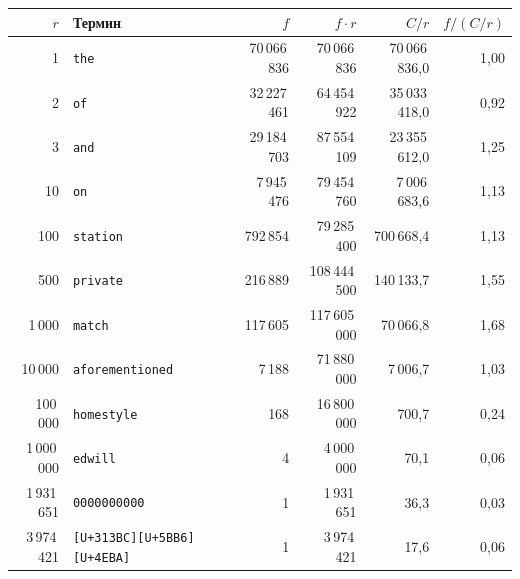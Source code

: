 \begin{tabular}{|r|l|r|r|r|r|}
\hline
$r$ & Термин & $f$ & $f \cdot r$ & $C/r$ & $f / (C/r)$ \\
\hline
1 & \texttt{the} & 70\,066\,836 & 70\,066\,836 & 70\,066\,836,0 & 1,00 \\
\hline
2 & \texttt{of} & 32\,227\,461 & 64\,454\,922 & 35\,033\,418,0 & 0,92 \\
\hline
3 & \texttt{and} & 29\,184\,703 & 87\,554\,109 & 23\,355\,612,0 & 1,25 \\
\hline
10 & \texttt{on} & 7\,945\,476 & 79\,454\,760 & 7\,006\,683,6 & 1,13 \\
\hline
100 & \texttt{station} & 792\,854 & 79\,285\,400 & 700\,668,4 & 1,13 \\
\hline
500 & \texttt{private} & 216\,889 & 108\,444\,500 & 140\,133,7 & 1,55 \\
\hline
1\,000 & \texttt{match} & 117\,605 & 117\,605\,000 & 70\,066,8 & 1,68 \\
\hline
10\,000 & \texttt{aforementioned} & 7\,188 & 71\,880\,000 & 7\,006,7 & 1,03 \\
\hline
100\,000 & \texttt{homestyle} & 168 & 16\,800\,000 & 700,7 & 0,24 \\
\hline
1\,000\,000 & \texttt{edwill} & 4 & 4\,000\,000 & 70,1 & 0,06 \\
\hline
1\,931\,651 & \texttt{0000000000} & 1 & 1\,931\,651 & 36,3 & 0,03 \\
\hline
3\,974\,421 & \texttt{[U+313BC][U+5BB6][U+4EBA]} & 1 & 3\,974\,421 & 17,6 & 0,06 \\
\hline
\end{tabular}
